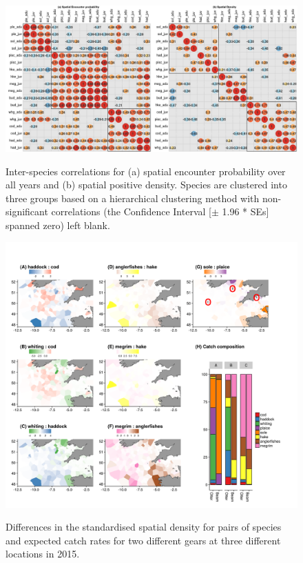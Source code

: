 \documentclass{nature}
\begin{document}
\begin{figure}
\begin{center}
	\includegraphics[width = \linewidth]{"../figures/Figure 1 - Omega1Omega2_Correlations_blank"}
	\label{fig:3}
	\caption{Inter-species correlations for (a) spatial encounter
		probability over all years and (b) spatial positive density.
		Species are clustered into three groups based on a
		hierarchical clustering method with non-significant
		correlations (the Confidence Interval [$\pm$ 1.96 * SEs] spanned
		zero) left blank.}
	\end{center}
\end{figure}

\begin{figure}
\begin{center}
	\includegraphics[width = \linewidth]{"../figures/Figure 4 - DensityDifferencesFigureswithCC"}
	\label{fig:4}
	\caption{Differences in the standardised spatial density for pairs of
		species and expected catch rates for two different gears at
		three different locations in 2015.}
\end{center}
\end{figure}
\end{document}
